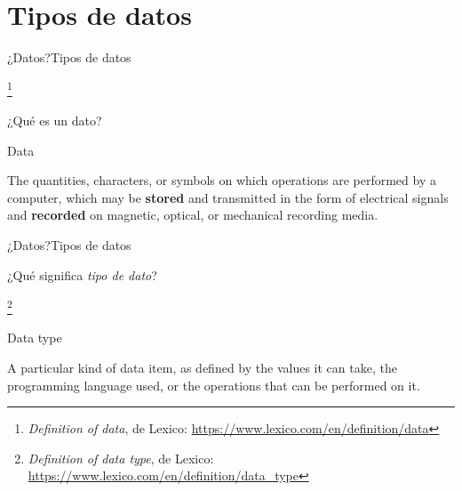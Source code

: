 \documentclass[spanish, handout]{beamer}
\newcommand\blfootnote[1]{%
\begingroup
\renewcommand\thefootnote{}\footnote{#1}%
\addtocounter{footnote}{-1}%
\endgroup
}
\begin{document}
\section{Tipos de datos}

\begin{frame}{¿Datos?}{Tipos de datos}

    \blfootnote{\textit{Definition of data}, de Lexico: \url{https://www.lexico.com/en/definition/data}}

    ¿Qué es un dato? \pause

    \bigskip
    
    \begin{block}{Data}
        \begin{displayquote}
            The \alert<3->{quantities}, \alert<3->{characters}, or \alert<3->{symbols} on which \alert<3->{operations} are performed by a computer, which may be \textbf<4->{stored} and transmitted in the form of electrical signals and \textbf<4->{recorded} on magnetic, optical, or mechanical recording media.
        \end{displayquote}
    \end{block} \pause

\end{frame}

\begin{frame}{¿Datos?}{Tipos de datos}

    ¿Qué significa \textit{tipo de dato}? \pause

    \blfootnote{\textit{Definition of data type}, de Lexico: \url{https://www.lexico.com/en/definition/data\_type}}

    \begin{block}{Data type}
        \begin{displayquote}
            A particular kind of data item, as defined by \alert<3->{the values it can take}, the programming language used, or \alert<3->{the operations that can be performed on it}.
        \end{displayquote}
    \end{block} \pause
\end{frame}
\end{document}

